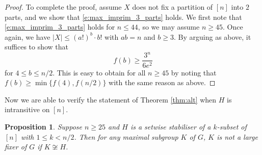 \documentclass[twoside,a4paper,reqno,11pt]{amsart}
\newcommand{\<}{\langle}
\renewcommand{\>}{\rangle}
\newcommand{\leqs}{\leqslant}
\newcommand{\geqs}{\geqslant}
\newtheorem{prop}[thm]{Proposition}
\theoremstyle{definition}
\begin{document}
\begin{proof}
		To complete the proof, assume $X$ does not fix a partition of $[n]$ into $2$ parts, and we show that \eqref{e:max_imprim_3_parts} holds. We first note that \eqref{e:max_imprim_3_parts} holds for $n\leqs 44$, so we may assume $n\geqs 45$. Once again, we have $|X|\leqs (a!)^b\cdot b!$	with $ab = n$ and $b\geqs 3$. By arguing as above, it suffices to show that
		\begin{equation*}
		f(b)\geqs \frac{3^n}{6e^2}
		\end{equation*}
		for $4\leqs b\leqs n/2$. This is easy to obtain for all $n\geqs 45$ by noting that $f(b)\geqs\min\{f(4),f(n/2)\}$ with the same reason as above.
	\end{proof}
	
	Now we are able to verify the statement of Theorem \ref{thm:alt} when $H$ is intransitive on $[n]$.
	
	\begin{prop}
		\label{p:max_An_K_intrans}
		Suppose $n\geqs 25$ and $H$ is a setwise stabiliser of a $k$-subset of $[n]$ with $1\leqs k < n/2$. Then for any maximal subgroup $K$ of $G$, $K$ is not a large fixer of $G$ if $K\not\cong H$.
	\end{prop}
	
\end{document}

